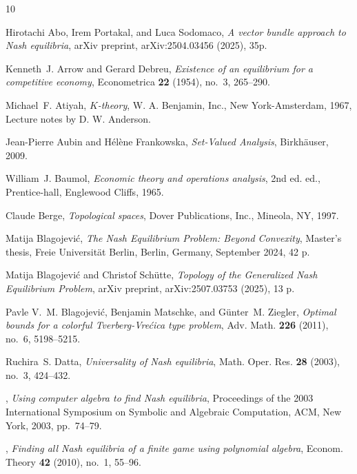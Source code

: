 \documentclass[a4paper,11pt,reqno,english]{amsart}
\theoremstyle{plain}
\theoremstyle{definition}
\begin{document}
\begin{thebibliography}{10}

Hirotachi Abo, Irem Portakal, and Luca Sodomaco, \emph{A vector bundle approach
  to Nash equilibria}, arXiv preprint, arXiv:2504.03456 (2025), 35p.

Kenneth~J. Arrow and Gerard Debreu, \emph{Existence of an equilibrium for a
  competitive economy}, Econometrica \textbf{22} (1954), no.~3, 265--290.

Michael~F. Atiyah, \emph{{$K$}-theory}, W. A. Benjamin, Inc., New
  York-Amsterdam, 1967, Lecture notes by D. W. Anderson.

Jean-Pierre Aubin and H\'{e}l\`{e}ne Frankowska, \emph{{Set-Valued Analysis}},
  Birkh\"{a}user, 2009.

William~J. Baumol, \emph{Economic theory and operations analysis}, 2nd ed. ed.,
  Prentice-hall, Englewood Cliffs, 1965.

Claude Berge, \emph{Topological spaces}, Dover Publications, Inc., Mineola, NY,
  1997.

Matija Blagojevi\'c, \emph{{The Nash Equilibrium Problem: Beyond Convexity}},
  Master's thesis, Freie Universit\"at Berlin, Berlin, Germany, September 2024,
  42 p.

Matija Blagojevi\'{c} and Christof Sch\"{u}tte, \emph{{Topology of the
  Generalized Nash Equilibrium Problem}}, arXiv preprint, arXiv:2507.03753
  (2025), 13 p.

Pavle V.~M. Blagojevi\'c, Benjamin Matschke, and G\" unter~M. Ziegler,
  \emph{Optimal bounds for a colorful {T}verberg-{V}re\'cica type problem},
  Adv. Math. \textbf{226} (2011), no.~6, 5198--5215.

Ruchira~S. Datta, \emph{Universality of {N}ash equilibria}, Math. Oper. Res.
  \textbf{28} (2003), no.~3, 424--432. 

\bysame, \emph{Using computer algebra to find {N}ash equilibria}, Proceedings
  of the 2003 {I}nternational {S}ymposium on {S}ymbolic and {A}lgebraic
  {C}omputation, ACM, New York, 2003, pp.~74--79.

\bysame, \emph{Finding all {N}ash equilibria of a finite game using polynomial
  algebra}, Econom. Theory \textbf{42} (2010), no.~1, 55--96.


\end{thebibliography}
\end{document}
